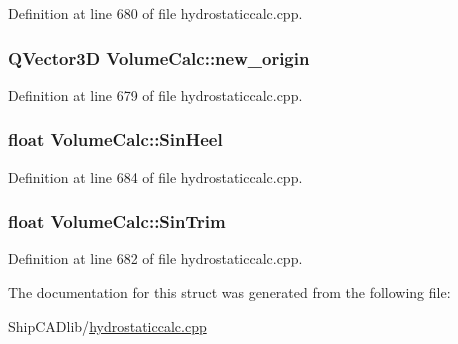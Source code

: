 Definition at line 680 of file hydrostaticcalc.\-cpp.

\hypertarget{structVolumeCalc_aed779c2eace630d0d41239df4d371407}{
\subsubsection[{new\-\_\-origin}]{\setlength{\rightskip}{0pt plus 5cm}Q\-Vector3\-D Volume\-Calc\-::new\-\_\-origin}}\label{structVolumeCalc_aed779c2eace630d0d41239df4d371407}


Definition at line 679 of file hydrostaticcalc.\-cpp.

\hypertarget{structVolumeCalc_ac1612ccb79673d6800b89a1acf46a028}{
\subsubsection[{Sin\-Heel}]{\setlength{\rightskip}{0pt plus 5cm}float Volume\-Calc\-::\-Sin\-Heel}}\label{structVolumeCalc_ac1612ccb79673d6800b89a1acf46a028}


Definition at line 684 of file hydrostaticcalc.\-cpp.

\hypertarget{structVolumeCalc_a36511f2f033b5488a4f677586f3e8f97}{
\subsubsection[{Sin\-Trim}]{\setlength{\rightskip}{0pt plus 5cm}float Volume\-Calc\-::\-Sin\-Trim}}\label{structVolumeCalc_a36511f2f033b5488a4f677586f3e8f97}


Definition at line 682 of file hydrostaticcalc.\-cpp.



The documentation for this struct was generated from the following file\-:\begin{DoxyCompactItemize}
\item 
Ship\-C\-A\-Dlib/\hyperlink{hydrostaticcalc_8cpp}{hydrostaticcalc.\-cpp}\end{DoxyCompactItemize}
